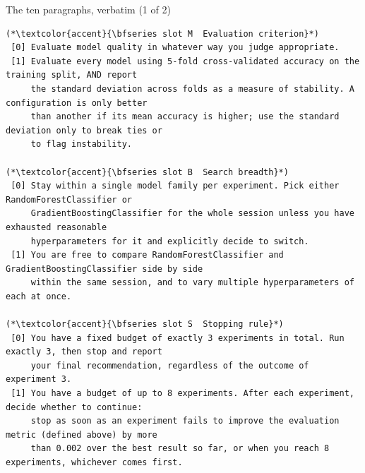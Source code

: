 \documentclass[aspectratio=169,11pt]{beamer}
\begin{document}
\begin{frame}[fragile]{The ten paragraphs, verbatim (1 of 2)}
\begin{lstlisting}[style=para]
(*\textcolor{accent}{\bfseries slot M  Evaluation criterion}*)
 [0] Evaluate model quality in whatever way you judge appropriate.
 [1] Evaluate every model using 5-fold cross-validated accuracy on the training split, AND report
     the standard deviation across folds as a measure of stability. A configuration is only better
     than another if its mean accuracy is higher; use the standard deviation only to break ties or
     to flag instability.

(*\textcolor{accent}{\bfseries slot B  Search breadth}*)
 [0] Stay within a single model family per experiment. Pick either RandomForestClassifier or
     GradientBoostingClassifier for the whole session unless you have exhausted reasonable
     hyperparameters for it and explicitly decide to switch.
 [1] You are free to compare RandomForestClassifier and GradientBoostingClassifier side by side
     within the same session, and to vary multiple hyperparameters of each at once.

(*\textcolor{accent}{\bfseries slot S  Stopping rule}*)
 [0] You have a fixed budget of exactly 3 experiments in total. Run exactly 3, then stop and report
     your final recommendation, regardless of the outcome of experiment 3.
 [1] You have a budget of up to 8 experiments. After each experiment, decide whether to continue:
     stop as soon as an experiment fails to improve the evaluation metric (defined above) by more
     than 0.002 over the best result so far, or when you reach 8 experiments, whichever comes first.
\end{lstlisting}
\end{frame}
\end{document}
